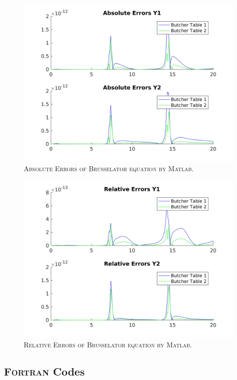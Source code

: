 \documentclass[a4paper,oneside]{book}
\numberwithin{equation}{chapter}
\begin{document}
\begin{figure}[H]
\centering
\includegraphics[scale=0.09]{1ae}
\caption{\textsc{Absolute Errors of Brusselator equation by Matlab.}}
\end{figure}
\begin{figure}[H]
\centering
\includegraphics[scale=0.09]{1re}
\caption{\textsc{Relative Errors of Brusselator equation by Matlab.}}
\end{figure}
\subsection{\textsc{Fortran} Codes}
\end{document}
